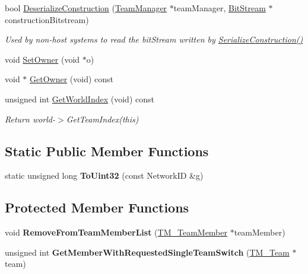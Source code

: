 \begin{DoxyCompactItemize}
bool \hyperlink{class_rak_net_1_1_t_m___team_a67edfd216d56e072201e455061403d2a}{Deserialize\-Construction} (\hyperlink{class_rak_net_1_1_team_manager}{Team\-Manager} $\ast$team\-Manager, \hyperlink{class_rak_net_1_1_bit_stream}{Bit\-Stream} $\ast$construction\-Bitstream)
\begin{DoxyCompactList}\small\item\em Used by non-\/host systems to read the bit\-Stream written by \hyperlink{class_rak_net_1_1_t_m___team_ab48e4f2b8324b0de9024788b987b079c}{Serialize\-Construction()} \end{DoxyCompactList}\item 
void \hyperlink{class_rak_net_1_1_t_m___team_ab4a4b6dc6432941d46a78cfe6a662a16}{Set\-Owner} (void $\ast$o)
\item 
void $\ast$ \hyperlink{class_rak_net_1_1_t_m___team_a860eb964acf3b60f38789b15c7fd1bcf}{Get\-Owner} (void) const 
\item 
\hypertarget{class_rak_net_1_1_t_m___team_a7644dfa3b4e280436eab1f5d74750c3d}{unsigned int \hyperlink{class_rak_net_1_1_t_m___team_a7644dfa3b4e280436eab1f5d74750c3d}{Get\-World\-Index} (void) const }\label{class_rak_net_1_1_t_m___team_a7644dfa3b4e280436eab1f5d74750c3d}

\begin{DoxyCompactList}\small\item\em Return world-\/$>$Get\-Team\-Index(this) \end{DoxyCompactList}\end{DoxyCompactItemize}
\subsection*{Static Public Member Functions}
\begin{DoxyCompactItemize}
\item 
\hypertarget{class_rak_net_1_1_t_m___team_a4c5daaa828ee5aae060787390c27020b}{static unsigned long {\bfseries To\-Uint32} (const Network\-I\-D \&g)}\label{class_rak_net_1_1_t_m___team_a4c5daaa828ee5aae060787390c27020b}

\end{DoxyCompactItemize}
\subsection*{Protected Member Functions}
\begin{DoxyCompactItemize}
\item 
\hypertarget{class_rak_net_1_1_t_m___team_a2d1d0b321b015afecf39c32ff6ab49b6}{void {\bfseries Remove\-From\-Team\-Member\-List} (\hyperlink{class_rak_net_1_1_t_m___team_member}{T\-M\-\_\-\-Team\-Member} $\ast$team\-Member)}\label{class_rak_net_1_1_t_m___team_a2d1d0b321b015afecf39c32ff6ab49b6}

\item 
\hypertarget{class_rak_net_1_1_t_m___team_ae89678b104e2e60111ac671d649d39a1}{unsigned int {\bfseries Get\-Member\-With\-Requested\-Single\-Team\-Switch} (\hyperlink{class_rak_net_1_1_t_m___team}{T\-M\-\_\-\-Team} $\ast$team)}\label{class_rak_net_1_1_t_m___team_ae89678b104e2e60111ac671d649d39a1}

\end{DoxyCompactItemize}
